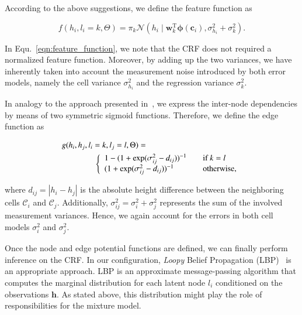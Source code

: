 According to the above suggestions, we define the feature function as

\begin{equation}
\label{eqn:feature_function}
f(h_i,l_i=k,\Theta)=\pi_k\mathcal{N}(h_i\mid\mathbf{w}_k^\text{T}
\boldsymbol{\phi}(\mathbf{c}_i), \sigma^2_{h_i} + \sigma^2_k).
\end{equation}

In Equ.~\eqref{eqn:feature_function}, we note that the CRF does not required a
normalized feature function. Moreover, by adding up the two variances, we have
inherently taken into account the measurement noise introduced by both error
models, namely the cell variance $\sigma^2_{h_i}$ and the regression variance
$\sigma^2_{k}$.

In analogy to the approach presented in~\cite{siegemund10curb}, we express the
inter-node dependencies by means of two symmetric sigmoid functions. Therefore,
we define the edge function as

\begin{eqnarray}
\label{eqn:edge_function}
g(h_i,h_j,l_i=k,l_j=l,\Theta)=\phantom{aaaaaaaaaaaaaaaaaaaaaaa}\\ \nonumber
\left\{
\begin{array}{l l}
1-(1+\exp(\sigma^2_{ij}-d_{ij}))^{-1} & \quad
\text{if $k=l$}\\
(1+\exp(\sigma^2_{ij}-d_{ij}))^{-1} & \quad
\text{otherwise},
\end{array} \right.
\end{eqnarray}

where $d_{ij}=|h_i-h_j|$ is the absolute height difference between the
neighboring cells $\mathcal{C}_i$ and $\mathcal{C}_j$. Additionally,
$\sigma^2_{ij}=\sigma^2_i+\sigma^2_j$ represents the sum of the involved
measurement variances. Hence, we again account for the errors in both cell
models $\sigma^2_i$ and $\sigma^2_j$.

Once the node and edge potential functions are defined, we can finally perform
inference on the CRF. In our configuration, \emph{Loopy} Belief
Propagation (LBP)~\cite{weiss00correctness} is an appropriate approach. LBP is
an approximate message-passing algorithm that computes the marginal distribution
for each latent node $l_i$ conditioned on the observations $\mathbf{h}$. As
stated above, this distribution might play the role of responsibilities for the
mixture model.
